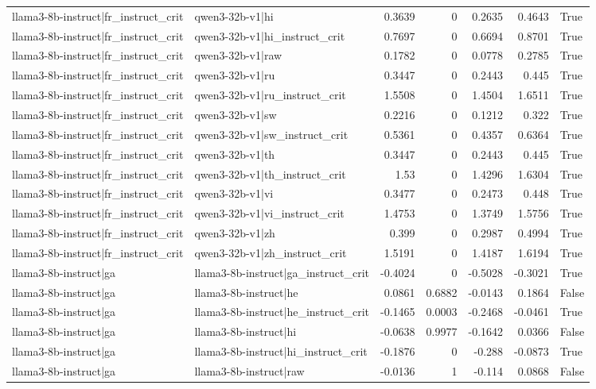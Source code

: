 \begin{table}
\begin{tabular}{l l r r r r l}
llama3-8b-instruct|fr_instruct_crit & qwen3-32b-v1|hi & 0.3639 & 0 & 0.2635 & 0.4643 & True \\
llama3-8b-instruct|fr_instruct_crit & qwen3-32b-v1|hi_instruct_crit & 0.7697 & 0 & 0.6694 & 0.8701 & True \\
llama3-8b-instruct|fr_instruct_crit & qwen3-32b-v1|raw & 0.1782 & 0 & 0.0778 & 0.2785 & True \\
llama3-8b-instruct|fr_instruct_crit & qwen3-32b-v1|ru & 0.3447 & 0 & 0.2443 & 0.445 & True \\
llama3-8b-instruct|fr_instruct_crit & qwen3-32b-v1|ru_instruct_crit & 1.5508 & 0 & 1.4504 & 1.6511 & True \\
llama3-8b-instruct|fr_instruct_crit & qwen3-32b-v1|sw & 0.2216 & 0 & 0.1212 & 0.322 & True \\
llama3-8b-instruct|fr_instruct_crit & qwen3-32b-v1|sw_instruct_crit & 0.5361 & 0 & 0.4357 & 0.6364 & True \\
llama3-8b-instruct|fr_instruct_crit & qwen3-32b-v1|th & 0.3447 & 0 & 0.2443 & 0.445 & True \\
llama3-8b-instruct|fr_instruct_crit & qwen3-32b-v1|th_instruct_crit & 1.53 & 0 & 1.4296 & 1.6304 & True \\
llama3-8b-instruct|fr_instruct_crit & qwen3-32b-v1|vi & 0.3477 & 0 & 0.2473 & 0.448 & True \\
llama3-8b-instruct|fr_instruct_crit & qwen3-32b-v1|vi_instruct_crit & 1.4753 & 0 & 1.3749 & 1.5756 & True \\
llama3-8b-instruct|fr_instruct_crit & qwen3-32b-v1|zh & 0.399 & 0 & 0.2987 & 0.4994 & True \\
llama3-8b-instruct|fr_instruct_crit & qwen3-32b-v1|zh_instruct_crit & 1.5191 & 0 & 1.4187 & 1.6194 & True \\
llama3-8b-instruct|ga & llama3-8b-instruct|ga_instruct_crit & -0.4024 & 0 & -0.5028 & -0.3021 & True \\
llama3-8b-instruct|ga & llama3-8b-instruct|he & 0.0861 & 0.6882 & -0.0143 & 0.1864 & False \\
llama3-8b-instruct|ga & llama3-8b-instruct|he_instruct_crit & -0.1465 & 0.0003 & -0.2468 & -0.0461 & True \\
llama3-8b-instruct|ga & llama3-8b-instruct|hi & -0.0638 & 0.9977 & -0.1642 & 0.0366 & False \\
llama3-8b-instruct|ga & llama3-8b-instruct|hi_instruct_crit & -0.1876 & 0 & -0.288 & -0.0873 & True \\
llama3-8b-instruct|ga & llama3-8b-instruct|raw & -0.0136 & 1 & -0.114 & 0.0868 & False \\

\end{tabular}
\end{table}
